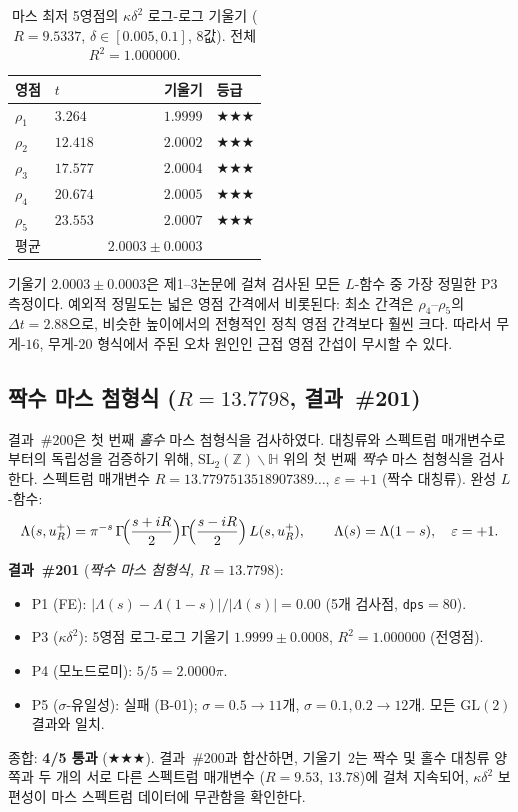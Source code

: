 \documentclass[11pt, a4paper]{article}
\theoremstyle{plain}
\theoremstyle{definition}
\begin{document}
\begin{table}[ht]
\centering
\caption{마스 최저 5영점의 $\kappa\delta^{2}$ 로그-로그 기울기
  ($R=9.5337$, $\delta\in[0.005,0.1]$, 8값). 전체 $R^{2}=1.000000$.}
\label{tab:maass_kd2}
\small
\begin{tabular}{llrl}
\toprule
영점 & $t$ & 기울기 & 등급 \\
\midrule
$\rho_1$ & $3.264$ & $1.9999$ & $\bigstar\bigstar\bigstar$ \\
$\rho_2$ & $12.418$ & $2.0002$ & $\bigstar\bigstar\bigstar$ \\
$\rho_3$ & $17.577$ & $2.0004$ & $\bigstar\bigstar\bigstar$ \\
$\rho_4$ & $20.674$ & $2.0005$ & $\bigstar\bigstar\bigstar$ \\
$\rho_5$ & $23.553$ & $2.0007$ & $\bigstar\bigstar\bigstar$ \\
\midrule
평균 & & $2.0003\pm 0.0003$ & \\
\bottomrule
\end{tabular}
\end{table}

기울기 $2.0003\pm 0.0003$은 제1--3논문에 걸쳐 검사된 모든 $L$-함수 중
가장 정밀한 P3 측정이다. 예외적 정밀도는 넓은 영점 간격에서 비롯된다:
최소 간격은 $\rho_4$--$\rho_5$의 $\Delta t=2.88$으로,
비슷한 높이에서의 전형적인 정칙 영점 간격보다 훨씬 크다.
따라서 무게-$16$, 무게-$20$ 형식에서 주된 오차 원인인
근접 영점 간섭이 무시할 수 있다.

\subsection{짝수 마스 첨형식 ($R=13.7798$, 결과~\#201)}
\label{ssec:maass_even}

결과~\#200은 첫 번째 \emph{홀수} 마스 첨형식을 검사하였다.
대칭류와 스펙트럼 매개변수로부터의 독립성을 검증하기 위해,
$\mathrm{SL}_2(\mathbb{Z})\backslash\mathbb{H}$ 위의
첫 번째 \emph{짝수} 마스 첨형식을 검사한다.
스펙트럼 매개변수 $R=13.7797513518907389\ldots$,
$\varepsilon=+1$ (짝수 대칭류).
완성 $L$-함수:
\[
  \Lambda(s,u_R^{+}) = \pi^{-s}\,
  \Gamma\!\Bigl(\frac{s+iR}{2}\Bigr)
  \Gamma\!\Bigl(\frac{s-iR}{2}\Bigr)\,L(s,u_R^{+}), \qquad
  \Lambda(s)=\Lambda(1-s), \quad \varepsilon=+1.
\]

\medskip
\noindent\textbf{결과~\#201} (\textit{짝수 마스 첨형식, $R=13.7798$}):
\begin{itemize}
  \item P1 (FE): $|\Lambda(s)-\Lambda(1-s)|/|\Lambda(s)|=0.00$ (5개 검사점,
        \texttt{dps}$=80$).
  \item P3 ($\kappa\delta^{2}$): 5영점 로그-로그 기울기
        $\mathbf{1.9999\pm 0.0008}$, $R^{2}=1.000000$ (전영점).
  \item P4 (모노드로미): $5/5=2.0000\pi$.
  \item P5 ($\sigma$-유일성): 실패 (B-01);
        $\sigma=0.5\to 11$개, $\sigma=0.1,0.2\to 12$개.
        모든 $\mathrm{GL}(2)$ 결과와 일치.
\end{itemize}
종합: \textbf{4/5 통과} ($\bigstar\bigstar\bigstar$).
결과~\#200과 합산하면, 기울기~$2$는 짝수 및 홀수 대칭류 양쪽과
두 개의 서로 다른 스펙트럼 매개변수 ($R=9.53$, $13.78$)에 걸쳐
지속되어, $\kappa\delta^{2}$ 보편성이 마스 스펙트럼 데이터에
무관함을 확인한다.
\end{document}
